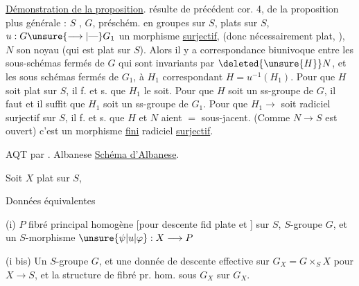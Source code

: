 \uline{Démonstration de la proposition}. 
résulte de  précédent cor. 4,
 de la proposition plus générale :
  $S$  ,
\margin{\rule[-2\baselineskip]{0.35pt}{2\baselineskip}}$G$,  préschém. en groupes  sur $S$, 
plats sur $S$, $u:G\unsure{\longrightarrow|\text{---}}G_1$ un morphisme 
\uline{surjectif}, (donc nécessairement plat, ),
$N$ son noyau (qui est  plat sur $S$).
Alors il y a correspondance biunivoque
\margin{\rule[-10\baselineskip]{0.35pt}{10\baselineskip}}entre les sous-schémas fermés  de
$G$ qui sont invariants par $\deleted{\unsure{H}}N$, et les
sous schémas fermés  de  $G_1$, à $H_1$
correspondant $H=u^{-1}(H_1)$. Pour que
$H$ soit  plat sur $S$, il f. et s. que
$H_1$ le soit. Pour que $H$ soit un
ss-groupe de $G$, il faut et il suffit que
$H_1$ soit un ss-groupe de $G_1$. Pour
que  $H_1\longrightarrow$ soit radiciel surjectif
sur $S$, il f. et s. que $H$ et $N$ aient
$=$   sous-jacent.  (Comme
$N\longrightarrow S$  est  ouvert) c'est un morphisme
\uline{fini} radiciel \uline{surjectif}.

AQT par .
\hfill Albanese
\uline{Schéma d'Albanese}.

Soit $X$   plat  sur $S$, 

 Données équivalentes


(i) $P$ fibré principal homogène [pour descente fid plate et ]
sur $S$, $S$-groupe $G$, et un $S$-morphisme $\unsure{\psi|u|\varphi}:X\longrightarrow P$

(i bis) Un $S$-groupe $G$, et une donnée de descente effective sur
$G_X=G\times_S X$ pour $X\longrightarrow S$, et la structure de  fibré
pr. hom.  sous $G_X$ sur $G_X$.

